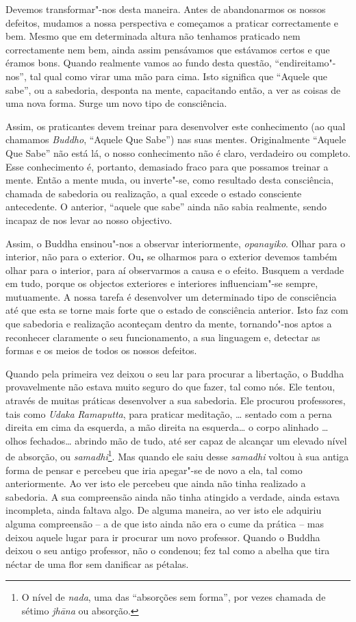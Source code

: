 Devemos transformar"-nos desta maneira. Antes de abandonarmos os nossos
defeitos, mudamos a nossa perspectiva e começamos a praticar
correctamente e bem. Mesmo que em determinada altura não tenhamos
praticado nem correctamente nem bem, ainda assim pensávamos que
estávamos certos e que éramos bons. Quando realmente vamos ao fundo
desta questão, ``endireitamo"-nos'', tal qual como virar uma mão para
cima. Isto significa que ``Aquele que sabe'', ou a sabedoria, desponta
na mente, capacitando então, a ver as coisas de uma nova forma. Surge um
novo tipo de consciência.

Assim, os praticantes devem treinar para desenvolver este conhecimento
(ao qual chamamos \emph{Buddho}, ``Aquele Que Sabe'') nas suas mentes.
Originalmente ``Aquele Que Sabe'' não está lá, o nosso conhecimento não
é claro, verdadeiro ou completo. Esse conhecimento é, portanto,
demasiado fraco para que possamos treinar a mente. Então a mente muda,
ou inverte"-se, como resultado desta consciência, chamada de sabedoria ou
realização, a qual excede o estado consciente antecedente. O anterior,
``aquele que sabe'' ainda não sabia realmente, sendo incapaz de nos
levar ao nosso objectivo.

Assim, o Buddha ensinou"-nos a observar interiormente, \emph{opanayiko}.
Olhar para o interior, não para o exterior. Ou\textbf{,} se olharmos
para o exterior devemos também olhar para o interior, para aí
observarmos a causa e o efeito. Busquem a verdade em tudo, porque os
objectos exteriores e interiores influenciam"-se sempre, mutuamente. A
nossa tarefa é desenvolver um determinado tipo de consciência até que
esta se torne mais forte que o estado de consciência anterior. Isto faz
com que sabedoria e realização aconteçam dentro da mente, tornando"-nos
aptos a reconhecer claramente o seu funcionamento, a sua linguagem e,
detectar as formas e os meios de todos os nossos defeitos.

Quando pela primeira vez deixou o seu lar para procurar a libertação, o
Buddha provavelmente não estava muito seguro do que fazer, tal como nós.
Ele tentou, através de muitas práticas desenvolver a sua sabedoria. Ele
procurou professores, tais como \emph{Udaka} \emph{Ramaputta}, para
praticar meditação, \ldots{} sentado com a perna direita em cima da
esquerda, a mão direita na esquerda\ldots{} o corpo alinhado \ldots{}
olhos fechados\ldots{} abrindo mão de tudo, até ser capaz de alcançar um
elevado nível de absorção, ou \emph{samadhi}\footnote{%
  O nível de \emph{nada}, uma das ``absorções sem forma'', por vezes
  chamada de sétimo \emph{jhāna} ou absorção.}.
Mas quando ele saiu
desse \emph{samadhi} voltou à sua antiga forma de pensar e percebeu que
iria apegar"-se de novo a ela, tal como anteriormente. Ao ver isto ele
percebeu que ainda não tinha realizado a sabedoria. A sua compreensão
ainda não tinha atingido a verdade, ainda estava incompleta, ainda
faltava algo. De alguma maneira, ao ver isto ele adquiriu alguma
compreensão -- a de que isto ainda não era o cume da prática -- mas
deixou aquele lugar para ir procurar um novo professor. Quando o Buddha
deixou o seu antigo professor, não o condenou; fez tal como a abelha que
tira néctar de uma flor sem danificar as pétalas.

